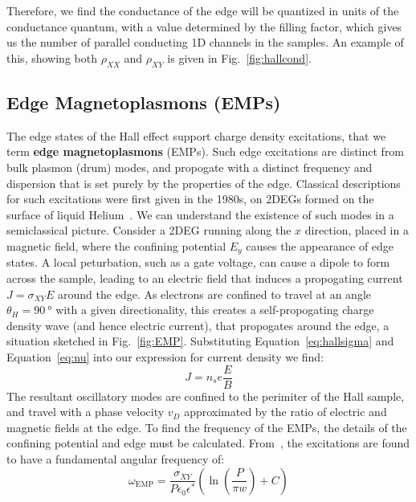 Therefore, we find the conductance of the edge will be quantized in units of the conductance quantum, with a value determined
by the filling factor, which gives us the number of parallel conducting 1D channels in the samples. An example of this, showing both $\rho_{XX}$
and $\rho_{XY}$ is given in Fig.~\ref{fig:hallcond}.

\subsection{Edge Magnetoplasmons (EMPs)}
The edge states of the Hall effect support charge density excitations, that we term \textbf{edge magnetoplasmons} (EMPs).
Such edge excitations are distinct from bulk plasmon (drum) modes, and propogate with
a distinct frequency and dispersion that is set purely by the properties of the edge. Classical descriptions for such excitations
were first given in the 1980s, on 2DEGs formed on the surface of liquid Helium~\cite{PhysRevLett.54.1706,PhysRevB.32.7676,1985ZhPmR..42..450V}.
We can understand the existence of such modes in a semiclassical picture. Consider a 2DEG running along the $x$ direction, placed in a magnetic field,
where the confining potential $E_y$ causes the appearance of edge states. A local peturbation, such as a gate voltage, can cause a dipole to form across
the sample, leading to an electric field that induces a propogating current $J = \sigma_{XY}E$ around the edge. As electrons are confined to travel at an
angle $\theta_H = \SI{90}{\degree}$ with a given directionality, this creates a self-propogating charge density wave (and hence electric current), that propogates
around the edge, a situation sketched in Fig.~\ref{fig:EMP}. Substituting Equation~\ref{eq:hallsigma} and Equation~\ref{eq:nu} into our expression for current density we find:
\begin{equation}
  J = n_s e \frac{E}{B}
\end{equation}
The resultant oscillatory modes are confined to the perimiter of the Hall sample, and travel with a phase velocity $v_D$ approximated by the ratio
of electric and magnetic fields at the edge. To find the frequency of the EMPs, the details of the confining potential and edge must be calculated.
From~\cite{1988ZhETF..94..217V}, the excitations are found to have a fundamental angular frequency of:
\begin{equation}
  \omega_{\textrm{EMP}} = \frac{\sigma_{XY}}{P\epsilon_0\epsilon^*}\left(\ln\left(\frac{P}{\pi w}\right) + C\right)
\end{equation}
